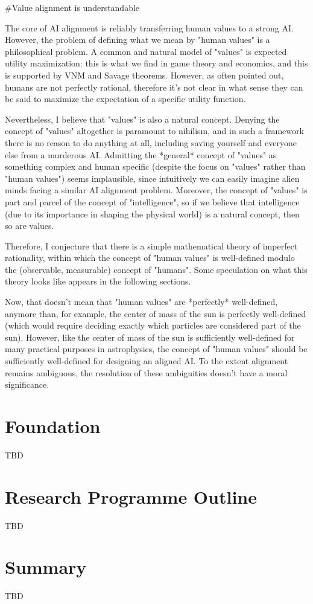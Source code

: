\documentclass[a4paper]{article}
\begin{document}
\#Value alignment is understandable

The core of AI alignment is reliably transferring human values to a strong AI. However, the problem of defining what we mean by "human values" is a philosophical problem. A common and natural model of "values" is expected utility maximization: this is what we find in game theory and economics, and this is supported by VNM and Savage theorems. However, as often pointed out, humans are not perfectly rational, therefore it's not clear in what sense they can be said to maximize the expectation of a specific utility function.

Nevertheless, I believe that "values" is also a natural concept. Denying the concept of "values" altogether is paramount to nihilism, and in such a framework there is no reason to do anything at all, including saving yourself and everyone else from a murderous AI. Admitting the *general* concept of "values" as something complex and human specific (despite the focus on "values" rather than "human values") seems implausible, since intuitively we can easily imagine alien minds facing a similar AI alignment problem. Moreover, the concept of "values" is part and parcel of the concept of "intelligence", so if we believe that intelligence (due to its importance in shaping the physical world) is a natural concept, then so are values.

Therefore, I conjecture that there is a simple mathematical theory of imperfect rationality, within which the concept of "human values" is well-defined modulo the (observable, measurable) concept of "humans". Some speculation on what this theory looks like appears in the following sections.

Now, that doesn't mean that "human values" are *perfectly* well-defined, anymore than, for example, the center of mass of the sun is perfectly well-defined (which would require deciding exactly which particles are considered part of the sun). However, like the center of mass of the sun is sufficiently well-defined for many practical purposes in astrophysics, the concept of "human values" should be sufficiently well-defined for designing an aligned AI. To the extent alignment remains ambiguous, the resolution of these ambiguities doesn't have a moral significance.

\section{Foundation}


TBD

\section{Research Programme Outline}


TBD

\section{Summary}


TBD
\end{document}
